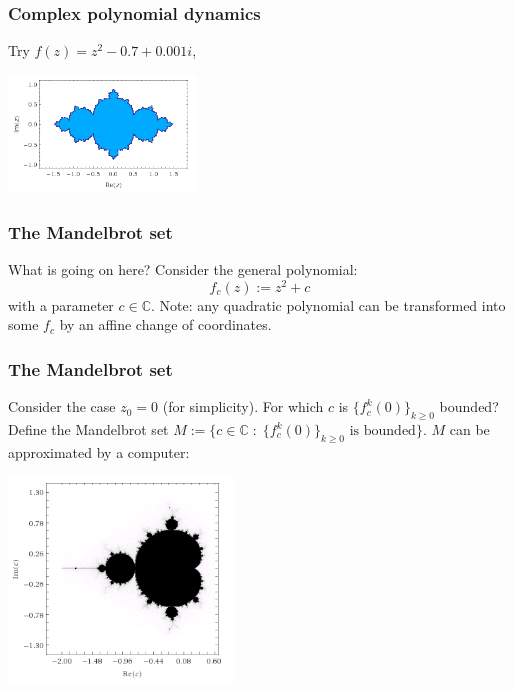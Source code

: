 \documentclass{beamer} %
\theoremstyle{definition} %
\newcommand{\Cplx}{\mathbb{C}}
\begin{document}
\begin{frame}\frametitle{Complex polynomial dynamics}
    Try $f(z) = z^2-0.7+0.001i$,\\
    \begin{center}
        \includegraphics[width=50mm]{img/julia-07001-filled.png}
    \end{center}
\end{frame}

\begin{frame}\frametitle{The Mandelbrot set}
    What is going on here?
    Consider the general polynomial:
    \begin{equation*}
        f_c(z) := z^2+c
    \end{equation*}
    with a parameter $c \in \Cplx$.
    Note: any quadratic polynomial can be transformed into some $f_c$ by an affine change of coordinates. 
\end{frame}

\begin{frame}\frametitle{The Mandelbrot set}
    Consider the case $z_0 = 0$ (for simplicity). For which $c$ is $\{f_c^k(0)\}_{k\geq 0}$ bounded?
    Define the Mandelbrot set $M := \{c \in \Cplx\;:\;\{f^k_c(0)\}_{k\geq 0}\text{ is bounded}\}$.
    $M$ can be approximated by a computer:
    \begin{center}
        \includegraphics[width=60mm]{img/mandelbrot.png}
    \end{center}
\end{frame}
% 
\end{document}
